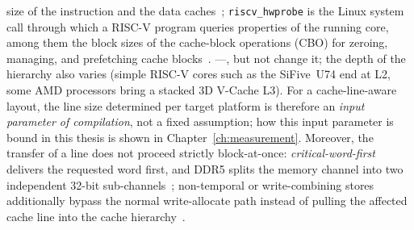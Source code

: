 \begin{nurlang}
{size of the instruction and the data caches~\cite{arm_arm}; \texttt{riscv\_hwprobe} is the Linux system
call through which a RISC-V program queries properties of the running core, among them the block sizes
of the cache-block operations (CBO) for zeroing, managing, and prefetching cache
blocks~\cite{linux_riscv_hwprobe}.} ---,
but not change it; the depth of the hierarchy also varies (simple
RISC-V cores such as the SiFive~U74 end at L2, some AMD processors bring a stacked 3D V-Cache L3). For a
cache-line-aware layout,
the line size determined per target platform is therefore an \emph{input parameter of compilation}, not
a fixed assumption; how this input parameter is bound in this thesis is shown in
Chapter~\ref{ch:measurement}. Moreover, the transfer of a line does not proceed strictly block-at-once: \emph{critical-word-first} delivers
the requested word first, and DDR5 splits the memory channel into two independent 32-bit
sub-channels~\cite{micron_ddr5}; non-temporal or write-combining stores additionally bypass the normal
write-allocate path instead of pulling the affected cache line into the cache
hierarchy~\cite{intel_sdm}.
\end{nurlang}

